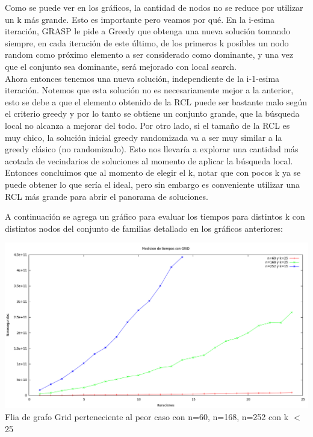 Como se puede ver en los gráficos, la cantidad de nodos no se reduce por utilizar un k más grande. Esto es importante pero veamos por qué.
En la i-esima iteración, GRASP le pide a Greedy que obtenga una nueva solución tomando siempre, en cada iteración de este último, de los primeros k posibles un nodo random como 
próximo elemento a ser considerado como dominante, y una vez que el conjunto sea dominante, será mejorado con local search.\\
Ahora entonces tenemos una nueva solución, independiente de la i-1-esima iteración. Notemos que esta solución no es necesariamente mejor a la anterior, 
esto se debe a que el elemento obtenido de la RCL puede ser bastante malo según el criterio greedy y por lo
tanto se obtiene un conjunto grande, que la búsqueda local no alcanza a mejorar del todo. Por otro lado, si el tamaño de la
RCL es muy chico, la solución inicial greedy randomizada va a ser muy similar a la greedy clásico (no randomizado). Esto nos
llevaría a explorar una cantidad más acotada de vecindarios de soluciones al momento de aplicar la búsqueda local.
Entonces concluimos que al momento de elegir el k, notar que con pocos k ya se puede obtener lo que sería el ideal, pero sin embargo es conveniente utilizar una RCL
más grande para abrir el panorama de soluciones.

A continuación se agrega un gráfico para evaluar los tiempos para distintos k con distintos nodos del conjunto de familias detallado en los gráficos anteriores:


\begin{center}
\includegraphics[width=17cm]{./graficos/grasp/medicionesdetiempocongrid.png}\\
Flia de grafo Grid perteneciente al peor caso con n=60, n=168, n=252 con k $<$ 25
\end{center}

